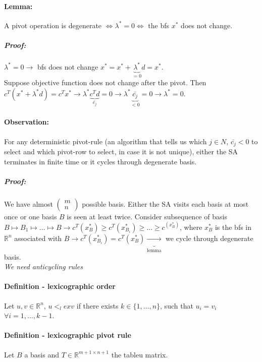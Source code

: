 \documentclass[main]{subfiles}
\begin{document}
\paragraph{Lemma:} A pivot operation is degenerate $\iff \lambda^* = 0 \iff$
the bfs $x^*$ does not change.

\subparagraph{Proof:}

$\lambda^* = 0 \rightarrow$ bfs does not change $x^* = x^* +
\underbrace{\lambda^*}_{=0} d = x^*$.\\
Suppose objective function does not change after the pivot. Then $c^T(x^* +
\lambda^* d) = c^T x^* \rightarrow \lambda^* \underbrace{c^T d}_{\bar{c_j}} = 0
\rightarrow \lambda^* \underbrace{\bar{c_j}}_{< 0} = 0 \rightarrow \lambda^* =
0$.

\paragraph{Observation:} For any deterministic pivot-rule (an algorithm that
tells us which $j \in N$, $\bar{c_j} < 0$ to select and which pivot-row to
select, in case it is not unique), either the SA terminates in finite time or
it cycles through degenerate basis.

\subparagraph{Proof:}
We have almost
$
\begin{pmatrix}
m \\
n
\end{pmatrix}$ possible basis. Either the SA visits each basis at most once or
one basis $B$ is seen at least twice. Consider subsequence of basis
$B \mapsto B_1 \mapsto \dots \mapsto B \rightarrow c^T(x^*_B) \geq 
c^T(x^*_{B_i}) \geq \dots \geq c^(x^*_B)$, where $x^*_B$ is the bfs in
$\mathbb{R}^n$ associated with $B \rightarrow c^T(x^*_{B_i}) = c^T(x^*_B)
\underbrace{\rightarrow}_{\text{lemma}}$ we cycle through degenerate basis.\\

\emph{We need anticycling rules}

\paragraph{Definition - lexicographic order}
Let $u, v \in \mathbb{R}^n$, $u <_lex v$ if there exists $k \in
\{1, \dots, n\}$, such that $u_i = v_i$ $\forall i = 1, \dots, k-1$.

\paragraph{Definition - lexicographic pivot rule}
Let $B$ a basis and $T \in \mathbb{R}^{m+1 \times n+1}$ the tableu matrix.
\end{document}
